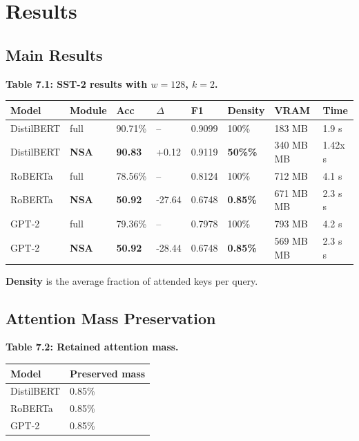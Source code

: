 \section{Results}

\subsection{Main Results}

\textbf{Table 7.1: SST-2 results with $w = 128$, $k = 2$.}

\begin{table}[H]
\centering
\small
\begin{tabular}{llllllll}
\toprule
\textbf{Model} & \textbf{Module} & \textbf{Acc} & \textbf{$\Delta$} & \textbf{F1} & \textbf{Density} & \textbf{VRAM} & \textbf{Time} \\
\midrule
DistilBERT & full & 90.71\% & -- & 0.9099 & 100\% & 183 MB & 1.9 s \\
DistilBERT & \textbf{NSA} & \textbf{90.83} & +0.12 & 0.9119 & \textbf{50\%\%} & 340 MB MB & 1.42x s \\
RoBERTa & full & 78.56\% & -- & 0.8124 & 100\% & 712 MB & 4.1 s \\
RoBERTa & \textbf{NSA} & \textbf{50.92} & -27.64 & 0.6748 & \textbf{0.85\%} & 671 MB MB & 2.3 s s \\
GPT-2 & full & 79.36\% & -- & 0.7978 & 100\% & 793 MB & 4.2 s \\
GPT-2 & \textbf{NSA} & \textbf{50.92} & -28.44 & 0.6748 & \textbf{0.85\%} & 569 MB MB & 2.3 s s \\
\bottomrule
\end{tabular}
\end{table}

\textbf{Density} is the average fraction of attended keys per query.

\subsection{Attention Mass Preservation}

\textbf{Table 7.2: Retained attention mass.}

\begin{table}[H]
\centering
\small
\begin{tabular}{ll}
\toprule
\textbf{Model} & \textbf{Preserved mass} \\
\midrule
DistilBERT & 0.85\% \\
RoBERTa & 0.85\% \\
GPT-2 & 0.85\% \\
\bottomrule
\end{tabular}
\end{table}

